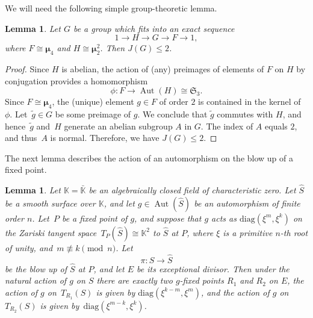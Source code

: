 \documentclass[12pt]{amsart}
\newcounter{cequation}[section]
\newtheorem{lemma}[cequation]{Lemma}
\theoremstyle{definition}
\theoremstyle{remark}
\newcommand{\KK}{\mathbb{K}}
\newcommand{\mumu}{{\boldsymbol{\mu}}}
\newcommand{\Aut}{\operatorname{Aut}}
\def \le {\leqslant}
\begin{document}
We will need the following simple group-theoretic lemma.

\begin{lemma}\label{lemma:small-2-group}
Let $G$ be a group which fits into an exact sequence
$$
1\to H\to G\to F\to 1,
$$
where $F\cong\mumu_4$ and $H\cong\mumu_2^2$.
Then $J(G)\le 2$.
\end{lemma}

\begin{proof}
Since $H$ is abelian,
the action of (any) preimages of elements of $F$ on $H$ by conjugation provides a homomorphism
$$
\phi\colon F\to\Aut(H)\cong\mathfrak{S}_3.
$$
Since $F\cong \mumu_4$, the (unique) element $g\in F$ of order $2$ is
contained in the kernel of~$\phi$. Let~\mbox{$\tilde{g}\in G$} be some preimage of $g$.
We conclude that $\tilde{g}$ commutes with $H$, and hence~$\tilde{g}$ and~$H$ generate an abelian subgroup $A$ in $G$.
The index of $A$ equals $2$, and thus~$A$ is normal.
Therefore, we have $J(G)\le 2$.
\end{proof}

The next lemma describes the action of an automorphism on the blow up of
a fixed point.


\begin{lemma}\label{lemma:3actiononP2}
Let $\KK=\bar{\KK}$ be an algebraically closed field of characteristic zero.
Let $\hat{S}$ be a smooth surface over $\KK$, and let $g\in\Aut(\hat{S})$
be an automorphism of finite order $n$. Let~$P$ be a fixed point of $g$, and
suppose that $g$ acts as $\mathrm{diag}(\xi^m, \xi^k)$ on the Zariski tangent
space~\mbox{$T_P(\hat{S})\cong\KK^2$} to $\hat{S}$ at $P$,
where $\xi$ is a primitive $n$-th root of unity,
and~\mbox{$m\not\equiv k\pmod n$}.
Let
$$
\pi\colon S\to \hat{S}
$$
be the blow up of $\hat{S}$ at $P$, and let $E$
be its exceptional divisor.
Then under the natural action of $g$ on $S$ there are exactly two
$g$-fixed points
$R_1$ and $R_2$ on $E$, the action of $g$ on~$T_{R_1}(S)$ is given by
$\mathrm{diag}(\xi^{k-m}, \xi^{m})$, and
the action of $g$ on~$T_{R_2}(S)$ is given
by~\mbox{$\mathrm{diag}(\xi^{m-k}, \xi^{k})$}.
\end{lemma}
\end{document}
